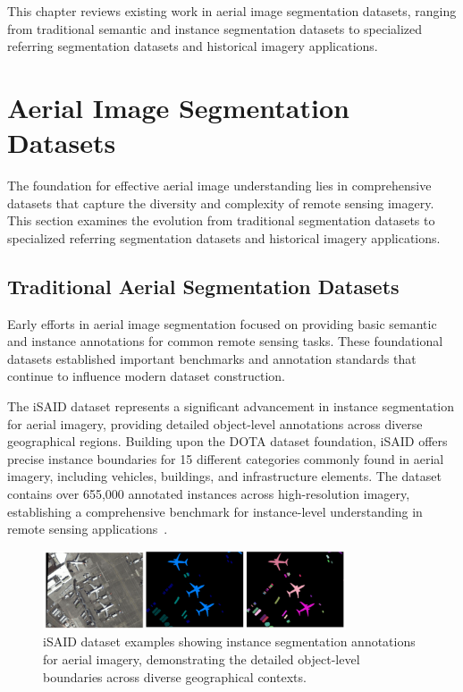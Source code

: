 \cleardoublepage
\label{chap:architecture}

This chapter reviews existing work in aerial image segmentation datasets, ranging from traditional semantic and instance segmentation datasets to specialized referring segmentation datasets and historical imagery applications.

\section{Aerial Image Segmentation Datasets}

The foundation for effective aerial image understanding lies in comprehensive datasets that capture the diversity and complexity of remote sensing imagery. This section examines the evolution from traditional segmentation datasets to specialized referring segmentation datasets and historical imagery applications.

\subsection{Traditional Aerial Segmentation Datasets}

Early efforts in aerial image segmentation focused on providing basic semantic and instance annotations for common remote sensing tasks. These foundational datasets established important benchmarks and annotation standards that continue to influence modern dataset construction.

The iSAID dataset represents a significant advancement in instance segmentation for aerial imagery, providing detailed object-level annotations across diverse geographical regions. Building upon the DOTA dataset foundation, iSAID offers precise instance boundaries for 15 different categories commonly found in aerial imagery, including vehicles, buildings, and infrastructure elements. The dataset contains over 655,000 annotated instances across high-resolution imagery, establishing a comprehensive benchmark for instance-level understanding in remote sensing applications~\cite{zamir2019isaid,xia2018dota}.

\begin{figure}[htbp]
\centering
\includegraphics[width=0.8\textwidth]{Images/isaid_examples.png}
\caption{iSAID dataset examples showing instance segmentation annotations for aerial imagery, demonstrating the detailed object-level boundaries across diverse geographical contexts.}
\label{fig:isaid_examples}
\end{figure}

